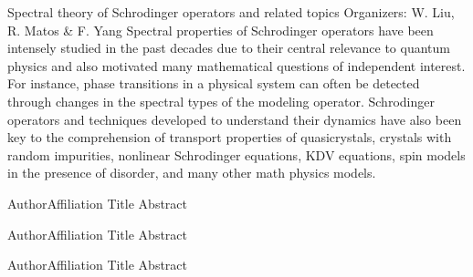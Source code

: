 \label{mini07}

\miniabs
{Spectral theory of Schrodinger operators and related topics}
{Organizers: W. Liu, R. Matos \& F. Yang}
{Spectral properties of Schrodinger operators have been intensely studied in the past decades due to their central relevance to quantum physics and also motivated many mathematical questions of independent interest. For instance, phase transitions in a physical system can often be detected through changes in the spectral types of the modeling operator. Schrodinger operators and techniques developed to understand their dynamics have also been key to the comprehension of transport properties of quasicrystals, crystals with random impurities, nonlinear Schrodinger equations, KDV equations, spin models in the presence of disorder, and many other math physics models.}
\vspace{2ex}



\abs
{Author}{Affiliation}
{Title}
{Abstract
}

\vspace{1.5ex}

\abs
{Author}{Affiliation}
{Title}
{Abstract
}

\vspace{1.5ex}

\abs
{Author}{Affiliation}
{Title}
{Abstract
}

